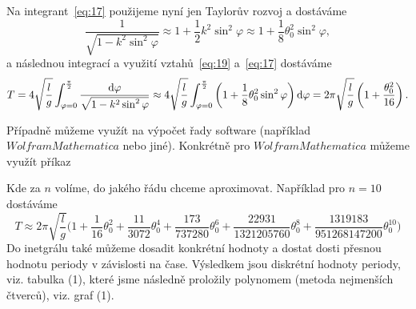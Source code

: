 \documentclass[reqno, a4paper]{amsart}
\begin{document}
		Na integrant~\eqref{eq:17} použijeme nyní jen Taylorův rozvoj a dostáváme
		\begin{equation}
			\label{eq:19}
			\frac{1}
			{
				\sqrt{1 - k^2 \sin^2 \varphi}
			}
			\approx
			1
			+
			\frac{1}{2}
			k^2
			\sin^2 \varphi
			\approx
			1
			+
			\frac{1}{8}
			\theta_{0}^2
			\sin^2 \varphi
			,
		\end{equation}
		a následnou integrací a využití vztahů~\eqref{eq:19} a~\eqref{eq:17} dostáváme
		\begin{equation}
			\label{eq:20}
			T
			=
			4
			\sqrt{
				\frac{l}{g}
			}
			\int_{\varphi=0}^{\frac{\pi}{2}}
			\frac{\mathrm{d} \varphi}
			{
				\sqrt{1 - k^2 \sin^2 \varphi}
			}
			\approx
			4
			\sqrt{
				\frac{l}{g}
			}
			\int_{\varphi=0}^{\frac{\pi}{2}}
			\left(
			1
			+
			\frac{1}{8}
			\theta_{0}^2
			\sin^2 \varphi
			\right)
			\mathrm{d} \varphi
			=
			2\pi
			\sqrt{\frac{l}{g}}
			\left(
			1
			+
			\frac{\theta_{0}^2}{16}
			\right)
			.
		\end{equation}
		
		Případně můžeme využít na výpočet řady software (například $ Wolfram Mathematica $ nebo jiné). Konkrétně pro $ Wolfram Mathematica $ můžeme využít příkaz
		
		\begin{verbatim*}
			
			k=Sin[\[Theta]/2]
			Series[1/(Sqrt[1-k^2*(Sin[x])^2]),{\[Theta],0,4}]
			Integrate[4*Sqrt[l/g]*Series[1/(Sqrt[1-k^2*(Sin[x])^2]),{\[Theta],0,n}],{x,0,Pi/2}]
			
		\end{verbatim*}
		Kde za $ n $ volíme, do jakého řádu chceme aproximovat. Například pro $ n=10 $ dostáváme
		\begin{equation*}
			T
			\approx
			2 \pi \sqrt{\frac{l}{g}} \bigg(  1 +\frac{1}{16}\theta_{0} ^2+\frac{11}{3072}\theta_{0} ^4+\frac{173}{737280} \theta_{0} ^6 +\frac{22931}{1321205760} \theta_{0} ^8 
			+\frac{1319183}{951268147200} \theta_{0} ^{10} \bigg)
		\end{equation*}
		Do inetgrálu také můžeme dosadit konkrétní hodnoty a dostat dosti přesnou hodnotu periody v závislosti na čase. Výsledkem jsou diskrétní hodnoty periody, viz. tabulka (1), které jsme následně proložily polynomem (metoda nejmenších čtverců), viz. graf (1). 

		\vspace{5mm}
\end{document}
